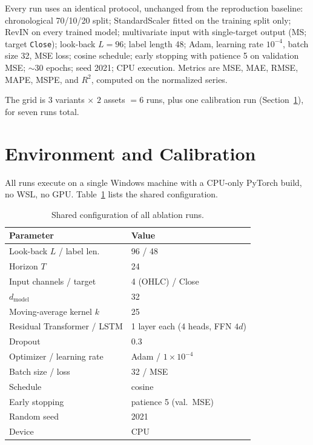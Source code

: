 \documentclass[conference]{IEEEtran}
\begin{document}
Every run uses an identical protocol, unchanged from the reproduction
baseline: chronological 70/10/20 split; StandardScaler fitted on the
training split only; RevIN on every trained model; multivariate input with
single-target output (MS; target \texttt{Close}); look-back $L{=}96$;
label length 48; Adam, learning rate $10^{-4}$, batch size 32, MSE loss;
cosine schedule; early stopping with patience 5 on validation MSE;
${\sim}30$ epochs; seed 2021; CPU execution. Metrics are MSE, MAE, RMSE,
MAPE, MSPE, and $R^2$, computed on the normalized series.

The grid is $3$ variants $\times$ $2$ assets $=6$ runs, plus one
calibration run (Section~\ref{sec:setup}), for seven runs total.

\section{Environment and Calibration}
\label{sec:setup}

All runs execute on a single Windows machine with a CPU-only PyTorch build,
no WSL, no GPU. Table~\ref{tab:config} lists the shared configuration.

\begin{table}[!t]
\centering
\caption{Shared configuration of all ablation runs.}
\label{tab:config}
\small
\begin{tabular}{@{}p{2.9cm}p{4.0cm}@{}}
\toprule
Parameter & Value \\
\midrule
Look-back $L$ / label len. & 96 / 48 \\
Horizon $T$ & 24 \\
Input channels / target & 4 (OHLC) / Close \\
$d_{\mathrm{model}}$ & 32 \\
Moving-average kernel $k$ & 25 \\
Residual Transformer / LSTM & 1 layer each (4 heads, FFN $4d$) \\
Dropout & 0.3 \\
Optimizer / learning rate & Adam / $1{\times}10^{-4}$ \\
Batch size / loss & 32 / MSE \\
Schedule & cosine \\
Early stopping & patience 5 (val.\ MSE) \\
Random seed & 2021 \\
Device & CPU \\
\bottomrule
\end{tabular}
\end{table}
\end{document}
